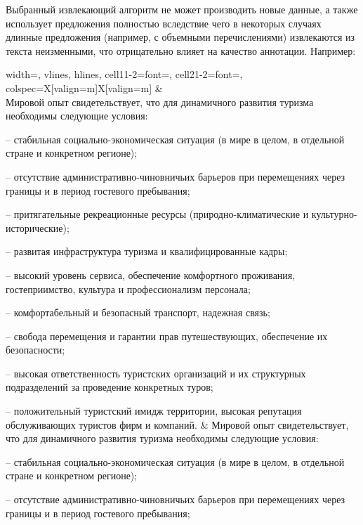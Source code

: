 \documentclass[12pt, a4paper]{article}
\begin{document}
    \begin{results}
    Выбранный извлекающий алгоритм не может производить новые данные, а также использует предложения полностью вследствие чего в некоторых случаях длинные предложения (например, с объемными перечислениями) извлекаются из текста неизменными, что отрицательно влияет на качество аннотации. Например:
        
    \begin{center}
        \begin{tblr}{
                width=\linewidth,
                vlines, hlines,
                cell{1}{1-2}={font=\fontsize{9pt}{12pt}\selectfont},
                cell{2}{1-2}={font=\itshape\fontsize{6pt}{9pt}\selectfont},
                colspec={X[valign=m]X[valign=m]} 
        }	
         & \\
        Мировой опыт свидетельствует, что для динамичного развития туризма необходимы следующие условия:

        – стабильная социально-экономическая ситуация (в мире в целом, в отдельной стране и конкретном регионе);

        – отсутствие административно-чиновничьих барьеров при перемещениях через границы и в период гостевого пребывания;

        – притягательные рекреационные ресурсы (природно-климатические и культурно-исторические);

        – развитая инфраструктура туризма и квалифицированные кадры;

        – высокий уровень сервиса, обеспечение комфортного проживания, гостеприимство, культура и профессионализм персонала;

        – комфортабельный и безопасный транспорт, надежная связь;

        – свобода перемещения и гарантии прав путешествующих, обеспечение их безопасности;

        – высокая ответственность туристских организаций и их структурных подразделений за проведение конкретных туров;

        – положительный туристский имидж территории, высокая репутация обслуживающих туристов фирм и компаний. & Мировой опыт свидетельствует, что для динамичного развития туризма необходимы следующие условия: 

        – стабильная социально-экономическая ситуация (в мире в целом, в отдельной стране и конкретном регионе); 

        – отсутствие административно-чиновничьих барьеров при перемещениях через границы и в период гостевого пребывания; 


\end{tblr}
\end{center}
\end{results}
\end{document}
